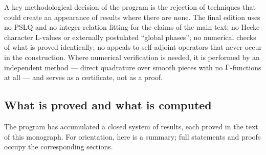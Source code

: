 A key methodological decision of the program is the rejection of
techniques that could create an appearance of results where there
are none. The final edition uses no PSLQ and no integer-relation
fitting for the claims of the main text; no Hecke character
L-values or externally postulated ``global phases''; no numerical
checks of what is proved identically; no appeals to self-adjoint
operators that never occur in the construction. Where numerical
verification is needed, it is performed by an independent method ---
direct quadrature over smooth pieces with no $\Gamma$-functions at all
--- and serves as a certificate, not as a proof.

\subsection{What is proved and what is computed}

The program has accumulated a closed system of results, each proved
in the text of this monograph. For orientation, here is a summary;
full statements and proofs occupy the corresponding sections.

